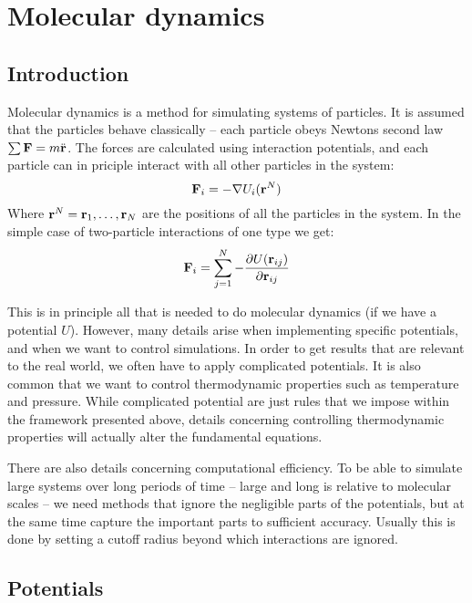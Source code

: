 \chapter{Molecular dynamics}

\section{Introduction}
Molecular dynamics is a method for simulating systems of particles. It is assumed that the particles behave classically -- each particle obeys Newtons second law $\sum \mathbf{F} = m\ddot{\mathbf{r}}$. The forces are calculated using interaction potentials, and each particle can in priciple interact with all other particles in the system:
\begin{equation}
	\mathbf{F}_i = -\nabla U_i(\mathbf{r}^N)
\end{equation}
Where $\mathbf{r}^N = \mathbf{r}_1, \dots, \mathbf{r}_N$ are the positions of all the particles in the system. In the simple case of two-particle interactions of one type we get:
\begin{equation}
	\mathbf{F}_i = \sum_{j=1}^N -\frac{\partial U(\mathbf{r}_{ij})}{\partial \mathbf{r}_{ij}}
\end{equation}

This is in principle all that is needed to do molecular dynamics (if we have a potential $U$). However, many details arise when implementing specific potentials, and when we want to control simulations. In order to get results that are relevant to the real world, we often have to apply complicated potentials. It is also common that we want to control thermodynamic properties such as temperature and pressure. While complicated potential are just rules that we impose within the framework presented above, details concerning controlling thermodynamic properties will actually alter the fundamental equations. 

There are also details concerning computational efficiency. To be able to simulate large systems over long periods of time -- large and long is relative to molecular scales -- we need methods that ignore the negligible parts of the potentials, but at the same time capture the important parts to sufficient accuracy. Usually this is done by setting a cutoff radius beyond which interactions are ignored. 

\section{Potentials}

